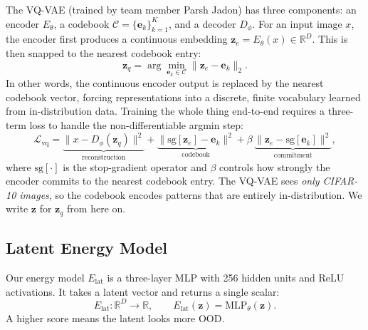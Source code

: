 \documentclass[10pt,twocolumn,letterpaper]{article}
\begin{document}
The VQ-VAE (trained by team member Parsh Jadon) has three components: an
encoder $E_\theta$, a codebook $\mathcal{C} = \{\mathbf{e}_k\}_{k=1}^{K}$,
and a decoder $D_\phi$. For an input image $x$, the encoder first
produces a continuous embedding $\mathbf{z}_e = E_\theta(x) \in \mathbb{R}^D$.
This is then snapped to the nearest codebook entry:
\begin{equation}
  \mathbf{z}_q = \arg\min_{\mathbf{e}_k \in \mathcal{C}}
                 \|\mathbf{z}_e - \mathbf{e}_k\|_2.
  \label{eq:vq}
\end{equation}
In other words, the continuous encoder output is replaced by the
nearest codebook vector, forcing representations into a discrete,
finite vocabulary learned from in-distribution data.
Training the whole thing end-to-end requires a three-term loss to handle
the non-differentiable argmin step:
\begin{equation}
  \mathcal{L}_{\mathrm{vq}} =
    \underbrace{\|x - D_\phi(\mathbf{z}_q)\|^2}_{\text{reconstruction}}
    + \underbrace{\|\mathrm{sg}[\mathbf{z}_e] - \mathbf{e}_k\|^2}_{\text{codebook}}
    + \beta\,\underbrace{\|\mathbf{z}_e - \mathrm{sg}[\mathbf{e}_k]\|^2}_{\text{commitment}},
  \label{eq:vqloss}
\end{equation}
where $\mathrm{sg}[\cdot]$ is the stop-gradient operator and $\beta$
controls how strongly the encoder commits to the nearest codebook entry.
The VQ-VAE sees \emph{only CIFAR-10 images}, so the codebook encodes
patterns that are entirely in-distribution. We write $\mathbf{z}$ for
$\mathbf{z}_q$ from here on.

\subsection{Latent Energy Model}

Our energy model $E_{\mathrm{lat}}$ is a three-layer MLP with 256 hidden
units and ReLU activations. It takes a latent vector and returns a single
scalar:
\begin{equation}
  E_{\mathrm{lat}} : \mathbb{R}^D \to \mathbb{R}, \qquad
  E_{\mathrm{lat}}(\mathbf{z}) = \mathrm{MLP}_\theta(\mathbf{z}).
  \label{eq:emodel}
\end{equation}
A higher score means the latent looks more OOD.
\end{document}
